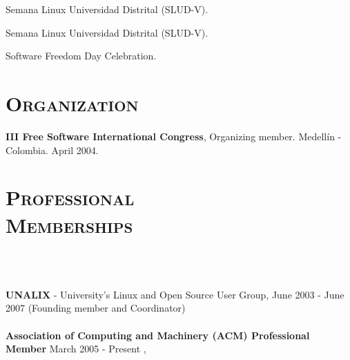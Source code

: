 \begin{resume}
\begin{formatb}
  \\
  \\
   \body
\end{formatb}

\begin{position}
Semana Linux Universidad Distrital (SLUD-V).
\end{position}
\newline     
\newline     
\newline     
\newline     


\begin{position}
Semana Linux Universidad Distrital (SLUD-V).
\end{position}

\begin{position}
Software Freedom Day Celebration.
\end{position}



\section{\textsc{Organization}}
\employer{\textbf{}}
\dates{}
\textbf{III Free Software International Congress}, Organizing member. Medell\'{i}n - Colombia. April 2004.

\section{\textsc{Professional\\ Memberships}}

\begin{formatb}
  \\
  \body\\
\end{formatb}
\employer{}
   {\textbf{UNALIX} - University's Linux and Open Source User Group,
     June 2003 - June 2007 (Founding member and Coordinator)\\ \\
    \textbf{Association of Computing and Machinery (ACM) Professional 
      Member} March 2005 - Present , 
 

}
\end{resume}

